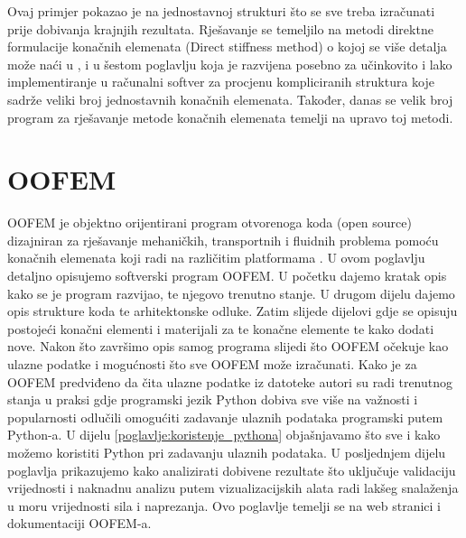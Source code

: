 \documentclass[a4paper,twoside,12pt]{memoir} %
\begin{document}
Ovaj primjer pokazao je na jednostavnoj strukturi što se sve treba izračunati prije dobivanja krajnjih rezultata. Rješavanje se temeljilo na metodi direktne formulacije konačnih elemenata (Direct stiffness method) o kojoj se više detalja može naći u \cite{direct_stiffness_method_article}, \cite{direct_stiffness_method} i u šestom poglavlju \cite{jurica_soric} koja je razvijena posebno za učinkovito i lako implementiranje u računalni softver za procjenu kompliciranih struktura koje sadrže veliki broj jednostavnih konačnih elemenata. Također, danas se velik broj program za rješavanje metode konačnih elemenata temelji na upravo toj metodi.



\chapter{OOFEM}	
OOFEM je objektno orijentirani program otvorenoga koda (open source) dizajniran za rješavanje mehaničkih, transportnih i fluidnih problema pomoću konačnih elemenata koji radi na različitim platformama \cite{oofem-web}. U ovom poglavlju detaljno opisujemo softverski program OOFEM. U početku dajemo kratak opis kako se je program razvijao, te njegovo trenutno stanje. U drugom dijelu dajemo opis strukture koda te arhitektonske odluke. Zatim slijede dijelovi gdje se opisuju postojeći konačni elementi i materijali za te konačne elemente te kako dodati nove. Nakon što završimo opis samog programa slijedi što OOFEM očekuje kao ulazne podatke i mogućnosti što sve OOFEM može izračunati. Kako je za OOFEM predviđeno da čita ulazne podatke iz datoteke autori su radi trenutnog stanja u praksi gdje programski jezik Python dobiva sve više na važnosti i popularnosti odlučili omogućiti zadavanje ulaznih podataka programski putem Python-a. U dijelu \ref{poglavlje:koristenje_pythona} objašnjavamo što sve i kako možemo koristiti Python pri zadavanju ulaznih podataka. U posljednjem dijelu poglavlja prikazujemo kako analizirati dobivene rezultate što uključuje validaciju vrijednosti i naknadnu analizu putem vizualizacijskih alata radi lakšeg snalaženja u moru vrijednosti sila i naprezanja. Ovo poglavlje temelji se na web stranici i dokumentaciji OOFEM-a. \cite{oofem_article} \cite{oofem-web}
\end{document}
